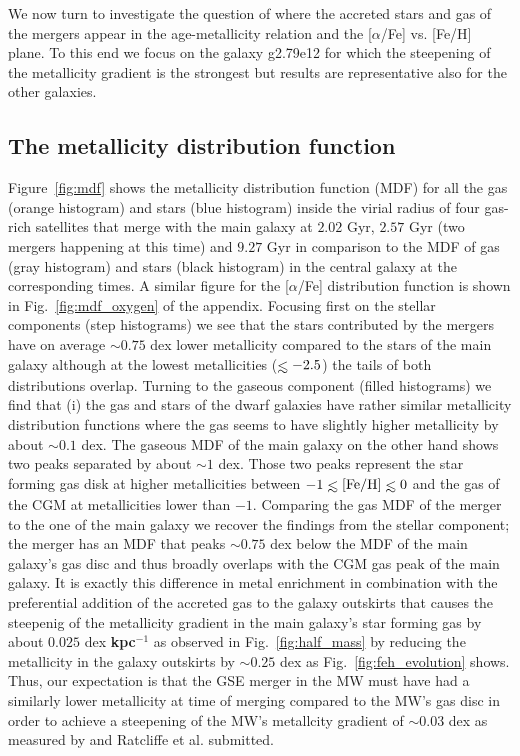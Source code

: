 \documentclass[useAMS,usenatbib]{mnras}
\def\lesssim{\mathrel{\hbox{\rlap{\hbox{\lower4pt\hbox{$\sim$}}}\hbox{$<$}}}}
\begin{document}
We now turn to investigate the question of where the accreted stars and gas of the mergers appear in the age-metallicity relation and the [$\alpha$/Fe] vs. [Fe/H] plane. To this end we focus on the galaxy g2.79e12 for which the steepening of the metallicity gradient is the strongest but results are representative also for the other galaxies.

\subsection{The metallicity distribution function}
\label{sec:mdf}

 Figure~\ref{fig:mdf} shows the metallicity distribution function (MDF) for all the gas (orange histogram) and stars (blue histogram) inside the virial radius of four gas-rich satellites that merge with the main galaxy at $2.02$ Gyr, $2.57$ Gyr (two mergers happening at this time) and $9.27$ Gyr in comparison to the MDF of gas (gray histogram) and stars (black histogram) in the central galaxy at the corresponding times. A similar figure for the [$\alpha$/Fe] distribution function is shown in Fig.~\ref{fig:mdf_oxygen} of the appendix. Focusing first on the stellar components (step histograms) we see that the stars contributed by the mergers have on average $\sim0.75$ dex lower metallicity compared to the stars of the main galaxy although at the lowest metallicities ($\lesssim-2.5$) the tails of both distributions overlap. Turning to the gaseous component (filled histograms) we find that (i) the gas and stars of the dwarf galaxies have rather similar metallicity distribution functions where the gas seems to have slightly higher metallicity by about $\sim0.1$ dex. The gaseous MDF of the main galaxy on the other hand shows two peaks separated by about $\sim1$ dex. Those two peaks represent the star forming gas disk at higher metallicities between $-1\lesssim \rm{[Fe/H]}\lesssim0$ and the gas of the CGM at metallicities lower than $-1$. Comparing the gas MDF of the merger to the one of the main galaxy we recover the findings from the stellar component; the merger has an MDF that peaks $\sim0.75$ dex below the MDF of the main galaxy's gas disc and thus broadly overlaps with the CGM gas peak of the main galaxy. It is exactly this difference in metal enrichment in combination with the preferential addition of the accreted gas to the galaxy outskirts that causes the steepenig of the metallicity gradient in the main galaxy's star forming gas by about $0.025$ dex \textbf{kpc$^{-1}$} as observed in Fig.~\ref{fig:half_mass} by reducing the metallicity in the galaxy outskirts by $\sim0.25$ dex as Fig.~\ref{fig:feh_evolution} shows. Thus, our expectation is that the GSE merger in the MW must have had a similarly lower metallicity at time of merging compared to the MW's gas disc in order to achieve a steepening of the MW's metallcity gradient of $\sim0.03$ dex as measured by \cite{Lu2022b} and Ratcliffe et al. submitted.
\end{document}
